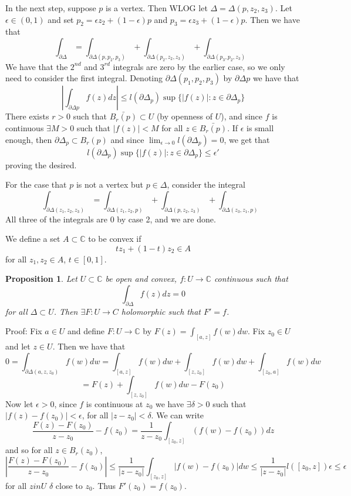 \documentclass[11pt]{article}
\theoremstyle{plain}
\newtheorem{proposition}[theorem]{Proposition}
\theoremstyle{definition}
\newcommand{\C}{\mathbb{C}}
\begin{document}
In the next step, suppose $p$ is a vertex. Then WLOG let $\Delta = \Delta(p, z_2, z_3)$. Let $\epsilon \in (0, 1)$ and set $p_2 = \epsilon z_2 + (1-\epsilon)p$ and $p_3 = \epsilon z_3 + (1- \epsilon)p$. Then we have that 
$$ \int_{\partial\Delta} = \int_{\partial\Delta(p, p_2, p_3)} + \int_{\partial\Delta(p_2, z_2, z_3)} + \int_{\partial\Delta(p_3, p_2, z_3)} $$
We have that the $2^{nd}$ and $3^{rd}$ integrals are zero by the earlier case, so we only need to consider the first integral. Denoting $\partial\Delta(p_1, p_2, p_3)$ by $\partial\Delta p$ we have that 
$$ \left|\int_{\partial\Delta p}f(z)dz\right| \leq l(\partial\Delta_p) \sup\{|f(z)|:z \in \partial\Delta_p\}$$
There exists $r > 0$ such that $\bar{B_r(p)} \subset U$ (by openness of $U$), and since $f$ is continuous $\exists M > 0$ such that $|f(z)| < M$ for all $z \in \bar{B_r(p)}$. If $\epsilon$ is small enough, then $\partial\Delta_p \subset B_r(p)$ and since $\lim_{\epsilon \to 0}l(\partial\Delta_p) = 0$, we get that 
$$ l(\partial\Delta_p)\sup\{|f(z)|:z \in \partial\Delta_p\} \leq \epsilon' $$
proving the desired.

For the case that $p$ is not a vertex but $p \in \Delta$, consider the integral 
$$ \int_{\partial\Delta(z_1, z_2, z_3)} = \int_{\partial\Delta(z_1, z_2, p)} + \int_{\partial\Delta(p, z_2, z_3)} + \int_{\partial\Delta(z_3, z_1, p)} $$
All three of the integrals are $0$ by case 2, and we are done.

We define a set $A \subset \mathbb{C}$ to be convex if 
$$ tz_1 + (1-t)z_2 \in A $$ 
for all $z_1, z_2 \in A$, $t \in [0, 1]$. 

\begin{proposition}
Let $U \subset \mathbb{C}$ be open and convex, $f: U \to \C$ continuous such that 
$$ \int_{\partial\Delta} f(z)dz = 0 $$
for all $\Delta \subset U$. Then $\exists F: U \to C$ holomorphic such that $F' = f$.
\end{proposition}

Proof: Fix $a \in U$ and define $F: U \to \C$ by $F(z) = \int_{[a,z]}f(w)dw$. Fix $z_0 \in U$ and let $z \in U$. Then we have that 
$$ 0 = \int_{\partial\Delta(a, z, z_0)} f(w)dw = \int_{[a,z]}f(w)dw + \int_{[z, z_0]}f(w)dw + \int_{[z_0, a]}f(w)dw $$
$$ = F(z) + \int_{[z, z_0]}f(w)dw - F(z_0) $$
Now let $\epsilon > 0$, since $f$ is continuous at $z_0$ we have $\exists \delta >0$ such that $|f(z) - f(z_0)| < \epsilon$, for all $|z - z_0| < \delta$. We can write 
$$ \frac{F(z) - F(z_0)}{z - z_0} - f(z_0) = \frac{1}{z - z_0} \int_{[z_0, z]} (f(w) - f(z_0))dz $$ 
and so for all $z \in B_r(z_0)$,
$$ \left| \frac{F(z) - F(z_0)}{z - z_0} - f(z_0)\right| \leq \frac{1}{|z - z_0|} \int_{[z_0, z]} |f(w) - f(z_0)|dw \leq \frac{1}{|z - z_0|} l([z_0, z]) \epsilon \leq \epsilon $$
for all $z in U$ $\delta$ close to $z_0$. Thus $F'(z_0) = f(z_0)$.
\end{document}
